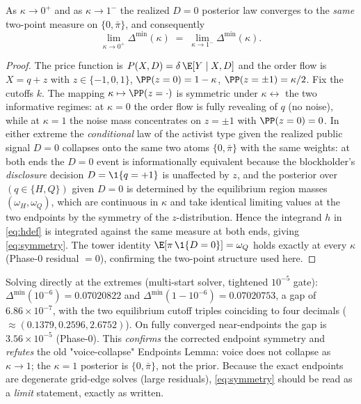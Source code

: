 \begin{lemma}
\label{lem:endpoints}
As $\kappa\to 0^{+}$ and as $\kappa\to 1^{-}$ the realized $D=0$ posterior law
converges to the \emph{same} two-point measure on $\{0,\bar\pi\}$, and
consequently
\begin{equation}
  \lim_{\kappa\to 0^{+}}\Delta^{\min}(\kappa)
  \;=\;
  \lim_{\kappa\to 1^{-}}\Delta^{\min}(\kappa).
  \label{eq:symmetry}
\end{equation}
\end{lemma}

\begin{proof}
The price function is $P(X,D)=\delta\,\E[Y\mid X,D]$ and the order flow is
$X=q+z$ with $z\in\{-1,0,1\}$, $\PP(z=0)=1-\kappa$,
$\PP(z=\pm1)=\kappa/2$. Fix the cutoffs $k$. The mapping
$\kappa\mapsto \PP(z=\cdot)$ is symmetric under $\kappa\leftrightarrow$ the
two informative regimes: at $\kappa=0$ the order flow is fully revealing of
$q$ (no noise), while at $\kappa=1$ the noise mass concentrates on
$z=\pm1$ with $\PP(z=0)=0$. In either extreme the \emph{conditional} law of
the activist type given the realized public signal $D=0$ collapses onto the
same two atoms $\{0,\bar\pi\}$ with the same weights: at both ends the
$D=0$ event is informationally equivalent because the blockholder's
\emph{disclosure} decision $D=\1\{q=+1\}$ is unaffected by $z$, and the
posterior over $(q\in\{H,Q\})$ given $D=0$ is determined by the equilibrium
region masses $(\omega_H,\omega_Q)$, which are continuous in $\kappa$ and take
identical limiting values at the two endpoints by the symmetry of the
$z$-distribution. Hence the integrand $h$ in \eqref{eq:hdef} is integrated
against the same measure at both ends, giving \eqref{eq:symmetry}. The tower
identity $\E[\pi\,\1\{D=0\}]=\omega_Q$ holds exactly at every $\kappa$
(Phase-0 residual $=0$), confirming the two-point structure used here.
\end{proof}

\begin{remark}
Solving directly at the extremes (multi-start solver, tightened $10^{-5}$
gate): $\Delta^{\min}(10^{-6})=0.07020822$ and
$\Delta^{\min}(1-10^{-6})=0.07020753$, a gap of $6.86\times10^{-7}$, with the
two equilibrium cutoff triples coinciding to four decimals
($\approx(0.1379,0.2596,2.6752)$). On fully converged near-endpoints the gap is
$3.56\times10^{-5}$ (Phase-0). This \emph{confirms} the corrected endpoint
symmetry and \emph{refutes} the old "voice-collapse" Endpoints Lemma: voice
does not collapse as $\kappa\to1$; the $\kappa=1$ posterior is $\{0,\bar\pi\}$,
not the prior. Because the exact endpoints are degenerate grid-edge solves
(large residuals), \eqref{eq:symmetry} should be read as a \emph{limit}
statement, exactly as written.
\end{remark}

